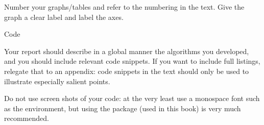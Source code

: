 Number your graphs/tables and refer to the numbering in the text.
Give the graph a clear label and label the axes.

 {Code}

Your report should describe in a global manner the algorithms you
developed, and you should include relevant code snippets. If you want
to include full listings, relegate that to an appendix:
code snippets in the text
should only be used to illustrate especially salient points.

Do not use screen shots of your code: at the very least use a
monospace font such as the  environment,
but using the  package
(used in this book)
is very much recommended.



